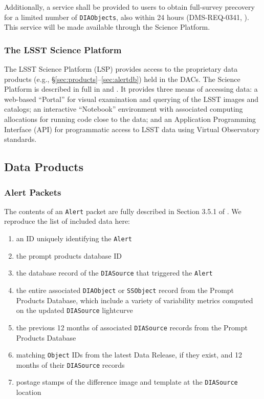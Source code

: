 Additionally, a service shall be provided to users to obtain full-survey precovery for a limited number of {\tt DIAObjects}, also within 24 hours (DMS-REQ-0341, ).
This service will be made available through the Science Platform.

\subsubsection{The LSST Science Platform} \label{sec:LSP}

The LSST Science Platform (LSP) provides access to the proprietary data products (e.g., \S \ref{sec:products}--\ref{sec:alertdb}) held in the DACs.
The Science Platform is described in full in  and .
It provides three means of accessing data: a web-based ``Portal'' for visual examination and querying of the LSST images and catalogs; 
an interactive ``Notebook'' environment with associated computing allocations for running code close to the data; 
and an Application Programming Interface (API) for programmatic access to LSST data using Virtual Observatory standards.


\subsection{Data Products}
\subsubsection{Alert Packets}\label{sec:packets}

The contents of an {\tt Alert} packet are fully described in Section 3.5.1 of . We reproduce the list of included data here:
\renewcommand{\labelenumi}{\Roman{enumi}.}
\begin{enumerate}
\item an ID uniquely identifying the {\tt Alert}
\item the prompt products database ID
\item the database record of the {\tt DIASource} that triggered the {\tt Alert}
\item the entire associated {\tt DIAObject} or {\tt SSObject} record from the Prompt Products Database, which include a variety of variability metrics computed on the updated \texttt{DIASource} lightcurve
\item the previous 12 months of associated {\tt DIASource} records from the Prompt Products Database
\item matching {\tt Object} IDs from the latest Data Release, if they exist, and 12 months of their {\tt DIASource} records
\item postage stamps of the difference image and template at the {\tt DIASource} location
\end{enumerate}

